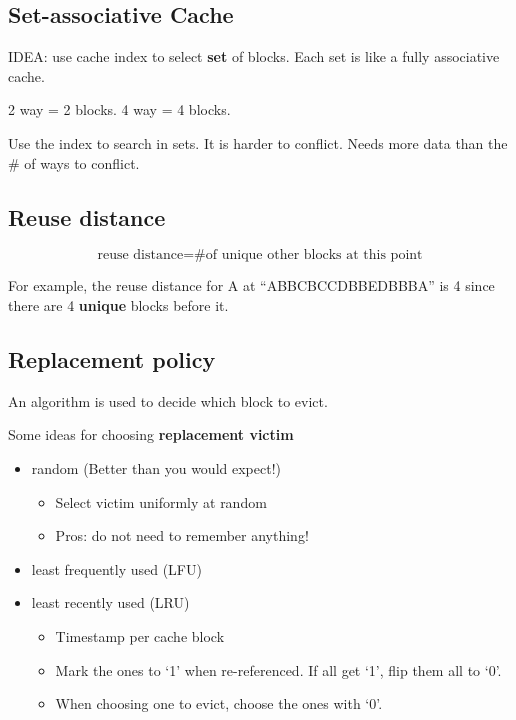 \documentclass[letterpaper,12pt]{article}
\begin{document}
\subsection{Set-associative Cache}

IDEA: use cache index to select \textbf{set} of blocks. Each set is like a fully associative cache.

2 way = 2 blocks. 4 way = 4 blocks.

Use the index to search in sets. It is harder to conflict. Needs more data than the \# of ways to conflict.


\subsection{Reuse distance}

\[
    \text{reuse distance} = \text{\# of unique other blocks at this point}
\]

For example, the reuse distance for A at ``ABBCBCCDBBEDBBBA'' is 4 since there are 4 \textbf{unique} blocks before it.

\subsection{Replacement policy}

An algorithm is used to decide which block to evict.

Some ideas for choosing \textbf{replacement victim}
\begin{itemize}
    \item random (Better than you would expect!)
          \begin{itemize}
              \item Select victim uniformly at random
              \item Pros: do not need to remember anything!
          \end{itemize}
    \item least frequently used (LFU)
    \item least recently used (LRU)
          \begin{itemize}
              \item Timestamp per cache block
              \item Mark the ones to `1' when re-referenced. If all get `1', flip them all to `0'.
              \item When choosing one to evict, choose the ones with `0'.
          \end{itemize}
\end{itemize}
\end{document}
